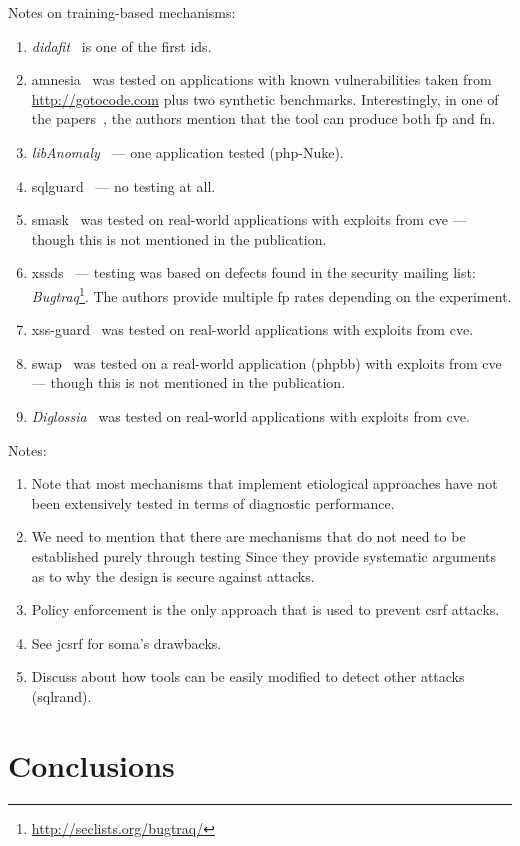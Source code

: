 \documentclass[conference]{IEEEtran}
\begin{document}
Notes on training-based mechanisms:
\begin{enumerate}
\item {\it {\sc didafit}}~\cite{LLW02} is one of
the first {\sc ids}.
\item {\sc amnesia}~\cite{HO05,HO06,HO05b} was tested
on applications with known vulnerabilities taken
from \url{http://gotocode.com} plus two synthetic benchmarks.
Interestingly, in one of the papers~\cite{HO06},
the authors mention that the tool can produce both {\sc fp} and
{\sc fn}.
\item {\it libAnomaly}~\cite{VMV05} --- one application tested ({\sc php}-Nuke).
\item {\sc sqlg}uard~\cite{BWS05} --- no testing at all.
\item {\sc sm}ask~\cite{JB07} was tested on real-world applications
with exploits from {\sc cve} --- though this is not mentioned in the publication.
\item {\sc xssds}~\cite{JEP08} --- testing was based on 
defects found in the security mailing
list: {\it Bugtraq}\footnote{\url{http://seclists.org/bugtraq/}}.
The authors provide multiple {\sc fp} rates depending on the experiment.
\item {\sc xss-guard}~\cite{BV08} was tested on real-world applications
with exploits from {\sc cve}.
\item {\sc swap}~\cite{WPLKK09} was tested on a real-world application ({\sc phpbb})
with exploits from {\sc cve} --- though this is not mentioned in the publication.
\item {\it Diglossia}~\cite{SMS13} was tested on real-world applications
with exploits from {\sc cve}.
\end{enumerate}

Notes:
\begin{enumerate}
\item Note that most mechanisms that implement etiological
approaches have not been extensively tested in terms of
diagnostic performance.
\item We need to mention that there are mechanisms that
do not need to be established purely through testing
Since they provide systematic arguments as to why
the design is secure against attacks.
\item Policy enforcement is the
only approach that is
used to prevent {\sc csrf} attacks.
\item See j{\sc csrf} for {\sc soma}'s drawbacks.
\item Discuss about how tools can be easily modified
to detect other attacks ({\sc sql}rand).
\end{enumerate}

\section{Conclusions}



\end{document}

